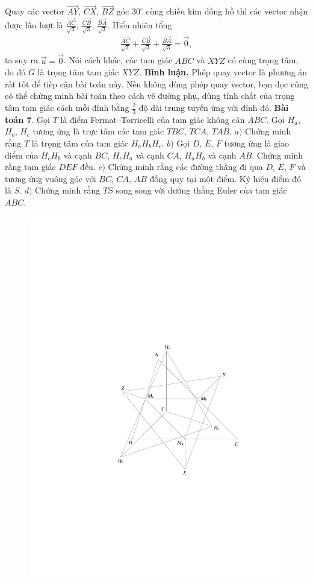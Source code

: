 \begin{multicols}{2}
	Quay các vector $\overrightarrow{AY}$, $\overrightarrow{CX}$, $\overrightarrow{BZ}$ góc $30^\circ$ cùng chiều kim đồng hồ thì các vector nhận được lần lượt là $\frac{\overrightarrow{AC}}{\sqrt{3}}$, $\frac{\overrightarrow{CB}}{\sqrt{3}}$, $\frac{\overrightarrow{BA}}{\sqrt{3}}$. Hiển nhiên tổng 
	\begin{align*}
		\frac{\overrightarrow{AC}}{\sqrt{3}}+\frac{\overrightarrow{CB}}{\sqrt{3}}+\frac{\overrightarrow{BA}}{\sqrt{3}}=\overrightarrow{0},
	\end{align*}
	ta suy ra $\overrightarrow{u}=\overrightarrow{0}$. Nói cách khác, các tam giác $ABC$ và $XYZ$ có cùng trọng tâm, do đó $G$ là trọng tâm tam giác $XYZ$.
	\vskip 0.1cm
	{\bf\color{cackithi} Bình luận.} Phép quay vector là phương án rất tốt để tiếp cận bài toán này. Nếu không dùng phép quay vector, bạn đọc cũng có thể chứng minh bài toán theo cách vẽ đường phụ, dùng tính chất của trọng tâm tam giác cách mỗi đỉnh bằng $\frac{2}{3}$ độ dài trung tuyến ứng với đỉnh đó.
	\vskip 0.1cm
	\textbf{\color{cackithi}Bài toán $\pmb{7.}$} Gọi $T$ là điểm Fermat--Torricelli của tam giác không cân $ABC$. Gọi $H_a$, $H_b$, $H_c$ tương ứng là trực tâm các tam giác $TBC$, $TCA$, $TAB$.
	\vskip 0.1cm
	$a)$ Chứng minh rằng $T$ là trọng tâm của tam giác $H_aH_bH_c$.
	\vskip 0.1cm
	$b)$ Gọi $D$, $E$, $F$ tương ứng là giao điểm của $H_cH_b$ và cạnh $BC$, $H_cH_a$ và cạnh $CA$, $H_aH_b$ và cạnh $AB$. Chứng minh rằng tam giác $DEF$ đều.
	\vskip 0.1cm
	$c)$ Chứng minh rằng các đường thẳng đi qua $D$, $E$, $F$ và tương ứng vuông góc với $BC$, $CA$, $AB$ đồng quy tại một điểm. Ký hiệu điểm đó là $S$.
	\vskip 0.1cm
	$d)$ Chứng minh rằng $TS$ song song với đường thẳng Euler của tam giác $ABC$.
	\begin{figure}[H]
		\vspace*{-5pt}
		\centering
		\captionsetup{labelformat= empty, justification=centering}
		\includegraphics[width= 0.8\linewidth]{figure7798}

\end{figure}
\end{multicols}
